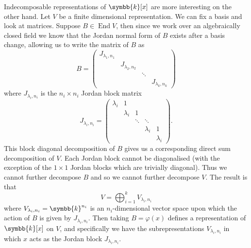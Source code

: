 \documentclass[fleqn]{NotesClass}
\renewcommand{\field}{\symbb{k}}
\DeclareMathOperator{\End}{End}
\begin{document}
\begin{exm}{}{}
        Indecomposable representations of \(\field[x]\) are more interesting on the other hand.
        Let \(V\) be a finite dimensional representation.
        We can fix a basis and look at matrices.
        Suppose \(B \in \End V\), then since we work over an algebraically closed field we know that the Jordan normal form of \(B\) exists after a basis change, allowing us to write the matrix of \(B\) as
        \begin{equation}
            B = 
            \begin{pmatrix}
                J_{\lambda_1, n_1} \\
                & J_{\lambda_2, n_2} \\
                & & \ddots \\
                & & & J_{\lambda_k, n_k}
            \end{pmatrix}
        \end{equation}
        where \(J_{\lambda_i, n_i}\) is the \(n_i \times n_i\) Jordan block matrix
        \begin{equation}
            J_{\lambda_i, n_i} = 
            \begin{pmatrix}
                \lambda_i & 1 \\
                & \lambda_i & 1\\
                & & \ddots & \ddots\\
                & & & \lambda_i & 1\\
                & & & & \lambda_i
            \end{pmatrix}
            .
        \end{equation}
        This block diagonal decomposition of \(B\) gives us a corresponding direct sum decomposition of \(V\).
        Each Jordan block cannot be diagonalised (with the exception of the \(1 \times 1\) Jordan blocks which are trivially diagonal).
        Thus we cannot further decompose \(B\) and so we cannot further decompose \(V\).
        The result is that
        \begin{equation}
            V = \bigoplus_{i=1}^{k} V_{\lambda_i, n_i}
        \end{equation}
        where \(V_{\lambda_i, n_i} = \field^{n_i}\) is an \(n_i\)-dimensional vector space upon which the action of \(B\) is given by \(J_{\lambda_i, n_i}\).
        Then taking \(B = \varphi(x)\) defines a representation of \(\field[x]\) on \(V\), and specifically we have the subrepresentations \(V_{\lambda_i, n_i}\) in which \(x\) acts as the Jordan block \(J_{\lambda_i, n_i}\).
    \end{exm}
    
\end{document}
